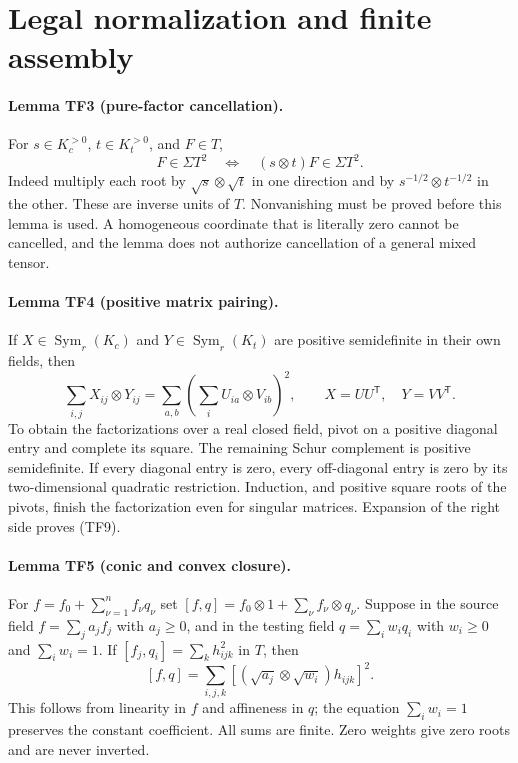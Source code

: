 \section{Legal normalization and finite assembly}
\paragraph{Lemma TF3 (pure-factor cancellation).}
For $s\in K_c^{>0}$, $t\in K_t^{>0}$, and $F\in T$,
\[
 F\in\Sigma T^2\quad\Longleftrightarrow\quad
                  (s\otimes t)F\in\Sigma T^2.
 \tag{TF8}
\]
Indeed multiply each root by $\sqrt s\otimes\sqrt t$ in one
direction and by $s^{-1/2}\otimes t^{-1/2}$ in the other.
These are inverse units of $T$. Nonvanishing must be proved before
this lemma is used. A homogeneous coordinate that is literally zero
cannot be cancelled, and the lemma does not authorize cancellation
of a general mixed tensor.

\paragraph{Lemma TF4 (positive matrix pairing).}
If $X\in\operatorname{Sym}_r(K_c)$ and
$Y\in\operatorname{Sym}_r(K_t)$ are positive semidefinite in their
own fields, then
\[
 \sum_{i,j}X_{ij}\otimes Y_{ij}
 =\sum_{a,b}\left(\sum_i U_{ia}\otimes V_{ib}\right)^2,
 \qquad X=UU^{\mathsf T},\quad Y=VV^{\mathsf T}.
 \tag{TF9}
\]
To obtain the factorizations over a real closed field, pivot on a
positive diagonal entry and complete its square. The remaining
Schur complement is positive semidefinite. If every diagonal entry
is zero, every off-diagonal entry is zero by its two-dimensional
quadratic restriction. Induction, and positive square roots of the
pivots, finish the factorization even for singular matrices.
Expansion of the right side proves (TF9).

\paragraph{Lemma TF5 (conic and convex closure).}
For $f=f_0+\sum_{\nu=1}^n f_\nu q_\nu$ set
$[f,q]=f_0\otimes1+\sum_\nu f_\nu\otimes q_\nu$.
Suppose in the source field
$f=\sum_j a_j f_j$ with $a_j\ge0$, and in the testing field
$q=\sum_i w_i q_i$ with $w_i\ge0$ and $\sum_iw_i=1$.
If $[f_j,q_i]=\sum_k h_{ijk}^2$ in $T$, then
\[
             [f,q]=\sum_{i,j,k}
                \left[(\sqrt{a_j}\otimes\sqrt{w_i})h_{ijk}\right]^2.
 \tag{TF10}
\]
This follows from linearity in $f$ and affineness in $q$; the equation
$\sum_iw_i=1$ preserves the constant coefficient. All sums are finite.
Zero weights give zero roots and are never inverted.

